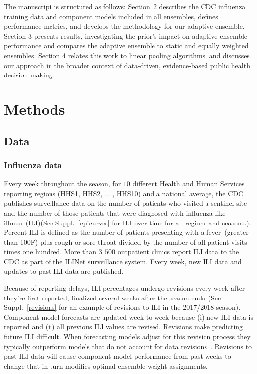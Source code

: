 \documentclass[sagev,times,Review,10pt]{sagej}
\begin{document}
The manuscript is structured as follows: Section~2 describes the CDC influenza training data and component models included in all ensembles, defines performance metrics, and develops the methodology for our adaptive ensemble. Section 3 presents results, investigating the prior's impact on adaptive ensemble performance and compares the adaptive ensemble to static and equally weighted ensembles. Section 4 relates this work to linear pooling algorithms, and discusses our approach in the broader context of data-driven, evidence-based public health decision making.


\section{Methods}

\subsection{Data}
\subsubsection{Influenza data}
Every week throughout the season, for $10$ different Health and Human Services reporting regions (HHS1, HHS2, ... , HHS10) and a national average, the CDC publishes surveillance data on the number of patients who visited a sentinel site and the number of those patients that were diagnosed with influenza-like illness~(ILI)(See Suppl.~\ref{epicurves} for ILI over time for all regions and seasons.).
Percent ILI is defined as the number of patients presenting with a fever~(greater than 100F) plus cough or sore throat divided by the number of all patient visits times one hundred.
More than $3,500$ outpatient clinics report ILI data to the CDC as part of the ILINet surveillance system.
Every week, new ILI data and updates to past ILI data are published.

Because of reporting delays, ILI percentages undergo revisions every week after they're first reported, finalized several weeks after the season ends~(See Suppl.~\ref{revisions} for an example of revisions to ILI in the 2017/2018 season).
Component model forecasts are updated week-to-week because (i) new ILI data is reported and (ii) all previous ILI values are revised.
Revisions make predicting future ILI difficult.
When forecasting models adjust for this revision process they typically outperform models that do not account for data revisions~\citep{brooks2018nonmechanistic}.
Revisions to past ILI data will cause component model performance from past weeks to change that in turn modifies optimal ensemble weight assignments.
\end{document}
